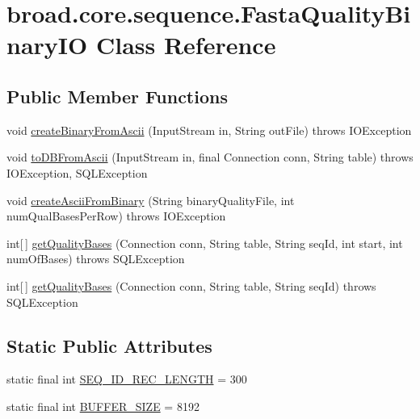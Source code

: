 \hypertarget{classbroad_1_1core_1_1sequence_1_1_fasta_quality_binary_i_o}{\section{broad.\+core.\+sequence.\+Fasta\+Quality\+Binary\+I\+O Class Reference}
\label{classbroad_1_1core_1_1sequence_1_1_fasta_quality_binary_i_o}
}
\subsection*{Public Member Functions}
\begin{DoxyCompactItemize}
\item 
void \hyperlink{classbroad_1_1core_1_1sequence_1_1_fasta_quality_binary_i_o_aa61d72cc22872856e9344310c57f2bff}{create\+Binary\+From\+Ascii} (Input\+Stream in, String out\+File)  throws I\+O\+Exception 
\item 
void \hyperlink{classbroad_1_1core_1_1sequence_1_1_fasta_quality_binary_i_o_af2de5ee3639e1d9c16bc7fbade2cc076}{to\+D\+B\+From\+Ascii} (Input\+Stream in, final Connection conn, String table)  throws I\+O\+Exception, S\+Q\+L\+Exception 
\item 
void \hyperlink{classbroad_1_1core_1_1sequence_1_1_fasta_quality_binary_i_o_ab97e7ca335721336cee440cb805fcc0e}{create\+Ascii\+From\+Binary} (String binary\+Quality\+File, int num\+Qual\+Bases\+Per\+Row)  throws I\+O\+Exception 
\item 
int\mbox{[}$\,$\mbox{]} \hyperlink{classbroad_1_1core_1_1sequence_1_1_fasta_quality_binary_i_o_af7767894725b0c910df465a59b87d437}{get\+Quality\+Bases} (Connection conn, String table, String seq\+Id, int start, int num\+Of\+Bases)  throws S\+Q\+L\+Exception 
\item 
int\mbox{[}$\,$\mbox{]} \hyperlink{classbroad_1_1core_1_1sequence_1_1_fasta_quality_binary_i_o_a7c627c4bd0d0b5a9c4ae2005fd908065}{get\+Quality\+Bases} (Connection conn, String table, String seq\+Id)  throws S\+Q\+L\+Exception 
\end{DoxyCompactItemize}
\subsection*{Static Public Attributes}
\begin{DoxyCompactItemize}
\item 
static final int \hyperlink{classbroad_1_1core_1_1sequence_1_1_fasta_quality_binary_i_o_a3c8ecdb5a93f86f2a1cff925a3603660}{S\+E\+Q\+\_\+\+I\+D\+\_\+\+R\+E\+C\+\_\+\+L\+E\+N\+G\+T\+H} = 300
\item 
static final int \hyperlink{classbroad_1_1core_1_1sequence_1_1_fasta_quality_binary_i_o_af92ef4c8281e95df9d7ecb8cfd0c0662}{B\+U\+F\+F\+E\+R\+\_\+\+S\+I\+Z\+E} = 8192
\end{DoxyCompactItemize}


